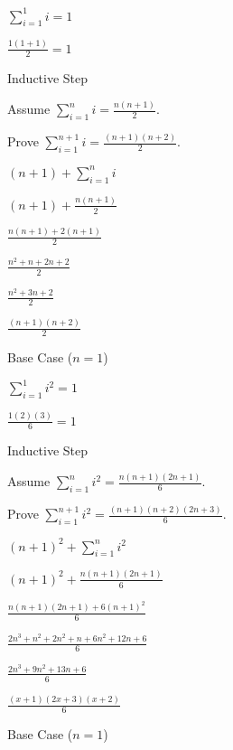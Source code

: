 \documentclass{exam}
\begin{document}
\begin{questions}
\begin{subparts}
\begin{center}
\(\sum_{i=1}^{1} i = 1\)

\(\frac{1(1+1)}{2} = 1\)
\vspace{5px}

Inductive Step

Assume \( \sum_{i=1}^{n} i = \frac{n(n+1)}{2} \). 

Prove \( \sum_{i=1}^{n+1} i = \frac{(n+1)(n+2)}{2} \).

\( (n+1) + \sum_{i=1}^{n} i \)

\( (n+1) + \frac{n(n+1)}{2} \)

\(  \frac{n(n+1) + 2(n+1)}{2} \)

\(  \frac{n^2 + n + 2n + 2}{2} \)

\(  \frac{n^2 + 3n + 2}{2} \)

\(  \frac{(n+1)(n+2)}{2} \)

\end{center}

\newpage


\begin{center}

Base Case (\(n = 1\))

\(\sum_{i=1}^{1} i^2 = 1\)

\(\frac{1(2)(3)}{6} = 1\)
\vspace{5px}

Inductive Step

Assume \( \sum_{i=1}^{n} i^2 = \frac{n(n+1)(2n+1)}{6} \). 

Prove \(  \sum_{i=1}^{n+1} i^2 = \frac{(n+1)(n+2)(2n+3)}{6} \).

\( (n+1)^2 + \sum_{i=1}^{n} i^2 \)

\( (n+1)^2 + \frac{n(n+1)(2n+1)}{6} \)

\(  \frac{n(n+1)(2n+1) + 6(n+1)^2}{6} \)

\(  \frac{2n^3 + n^2 + 2n^2 + n + 6n^2 + 12n + 6}{6} \)

\(  \frac{2n^3 + 9n^2 + 13n + 6}{6} \)

\(  \frac{(x+1)(2x+3)(x+2)}{6} \)

\end{center}


\begin{center}

Base Case (\(n = 1\))


\end{center}
\end{subparts}
\end{questions}
\end{document}
